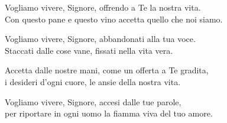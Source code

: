 
\strofa Vogliamo vivere, Signore, offrendo a Te la nostra vita.\\
Con questo pane e questo vino accetta quello che noi siamo.

\spazio

Vogliamo vivere, Signore, abbandonati alla tua voce.\\
Staccati dalle cose vane, fissati nella vita vera.

\spazio


\spazio

\strofa Accetta dalle nostre mani, come un offerta a Te gradita,\\
i desideri d'ogni cuore, le ansie della nostra vita.

\spazio

Vogliamo vivere, Signore, accesi dalle tue parole,\\
per riportare in ogni uomo la fiamma viva del tuo amore.

\spazio


\spazio

 